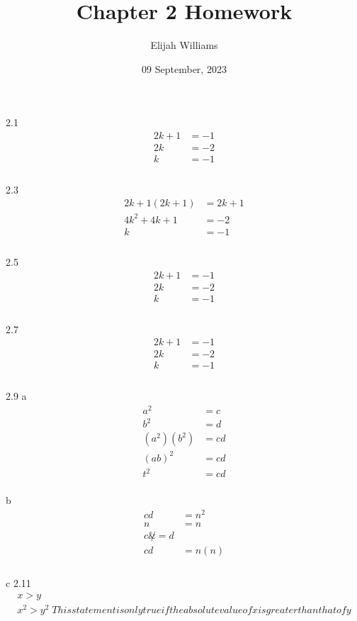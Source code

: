 \documentclass{article}
\title{Chapter 2 Homework}
\author{Elijah Williams}
\date{09 September, 2023}
\begin{document}
\begin{center}
\maketitle
\newpage
{\Huge 2.1}
\begin{align*}
  2k + 1 &= -1\\
  2k &= -2\\
  k &= -1\\
\end{align*}\\
{\Huge 2.3}
\begin{align*}
  2k + 1 (2k + 1) &= 2k + 1\\
  4k^2 + 4k + 1 &= -2\\
  k &= -1\\
\end{align*}\\
{\Huge 2.5}
\begin{align*}
  2k + 1 &= -1\\
  2k &= -2\\
  k &= -1\\
\end{align*}\\
{\Huge 2.7}
\begin{align*}
  2k + 1 &= -1\\
  2k &= -2\\
  k &= -1\\
\end{align*}\\
 {\Huge 2.9}
 {\large a }           
\begin{align*}
  a^2 &= c\\
  b^2 &= d\\
  (a^2)(b^2) &= cd\\ 
  (ab)^2 &= cd\\
  t^2 &= cd
\end{align*}\\
{\large b}
\begin{align*}
  cd &= n^2\\
  n &= n\\
  c \not &= d\\
  cd &= n(n)\\
\end{align*}\\    
{\large c }
\newline
{\Huge 2.11}
\begin{align*}
  x > y \\ 
  x^2 > y^2\; This statement is only true if the absolute value of x is greater than that of y\\

\end{align*}
\end{center}
\end{document}
